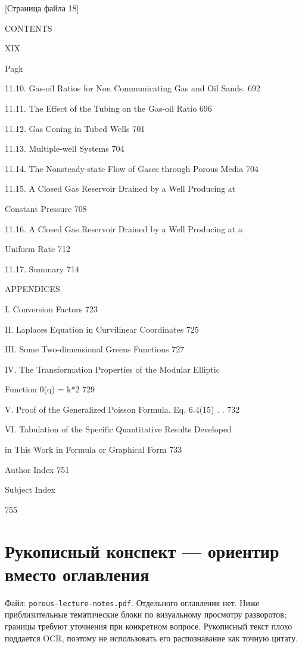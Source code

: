 \documentclass[
  11pt,
]{article}
\begin{document}
\smallskip
\smallskip
\smallskip
{[}Страница файла 18{]}\par
CONTENTS \par
XIX \par
Pagk \par
11.10. Gas-oil Ratios for Non Communicating Gas and Oil Sands. 692 \par
11.11. The Effect of the Tubing on the Gas-oil Ratio 696 \par
11.12. Gas Coning in Tubed Wells 701 \par
11.13. Multiple-well Systems 704 \par
11.14. The Nonsteady-state Flow of Gases through Porous Media 704 \par
11.15. A Closed Gas Reservoir Drained by a Well Producing at \par
Constant Pressure 708 \par
11.16. A Closed Gas Reservoir Drained by a Well Producing at a \par
Uniform Rate 712 \par
11.17. Summary 714 \par
APPENDICES \par
I. Conversion Factors 723 \par
II. Laplace\textquotesingle s Equation in Curvilinear Coordinates 725 \par
III. Some Two-dimensional Green\textquotesingle s Functions 727 \par
IV. The Transformation Properties of the Modular Elliptic \par
Function 0(q) = k*2 729 \par
V. Proof of the Generalized Poisson Formula. Eq. 6.4(15) . . 732 \par
VI. Tabulation of the Specific Quantitative Results Developed \par
in This Work in Formula or Graphical Form 733 \par
Author Index 751 \par
Subject Index \par
755\par
\endgroup


\section{Рукописный конспект --- ориентир вместо оглавления}\label{section-17}

Файл: \texttt{porous-lecture-notes.pdf}. Отдельного оглавления нет. Ниже приблизительные тематические блоки по визуальному просмотру разворотов; границы требуют уточнения при конкретном вопросе. Рукописный текст плохо поддается OCR, поэтому не использовать его распознавание как точную цитату.
\end{document}
